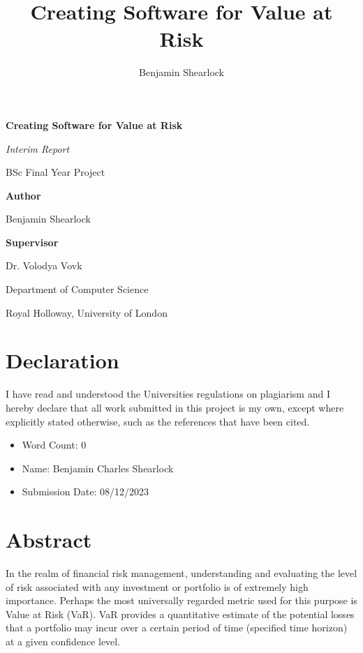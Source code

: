 \documentclass{article}
\title{Creating Software for Value at Risk}
\author{Benjamin Shearlock}
\begin{document}
\raggedright

\begin{titlepage}
  \begin{center}
    \vspace*{1cm}
    {\LARGE \textbf{Creating Software for Value at Risk} \par} 
    \vspace{1.5cm}
    {\Large \textit{Interim Report} \par}
    \vspace{0.5cm}
    {\Large BSc Final Year Project \par}
    \vspace{2cm}
    {\large \textbf{Author} \par}
    {\large Benjamin Shearlock \par}
    \vspace{2cm}
    {\large \textbf{Supervisor} \par}
    {\large Dr. Volodya Vovk \par}
    \vfill
    {\large Department of Computer Science \par}
    {\large Royal Holloway, University of London \par}
  \end{center}
\end{titlepage}

\setlength{\parindent}{0pt}

\section*{Declaration}
I have read and understood the Universities regulations on plagiarism and I hereby declare that all work submitted in this project is my own, except where explicitly stated otherwise, such as the references that have been cited. \\

\begin{itemize}
  \item Word Count: 0
  \item Name: Benjamin Charles Shearlock
  \item Submission Date: 08/12/2023
\end{itemize}

\newpage

\tableofcontents

\newpage

\section{Abstract}
In the realm of financial risk management, understanding and evaluating the level of risk associated with any investment or portfolio is of extremely high importance. Perhaps the most universally regarded metric used for this purpose is Value at Risk (VaR). VaR provides a quantitative estimate of the potential losses that a portfolio may incur over a certain period of time (specified time horizon) at a given confidence level. \\\vspace{0.3cm}
\end{document}
